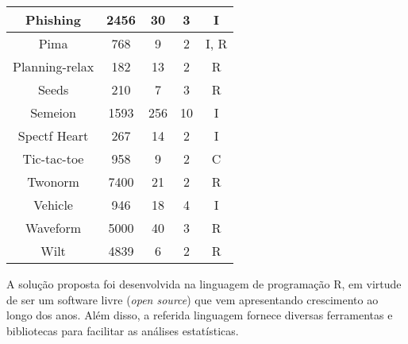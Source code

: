 \begin{table}[h]
\begin{tabular}{|c|c|c|c|c|}
            Phishing                     & 2456  &  30 &  3 & I \\ \hline
            Pima                         &  768  &   9 &  2 & I, R \\ \hline
            Planning-relax               &  182  &  13 &  2 & R \\ \hline
            Seeds                        &  210  &   7 &  3 & R \\ \hline
            Semeion                      & 1593  & 256 & 10 & I \\ \hline
            Spectf Heart                 &  267  &  14 &  2 & I \\ \hline
            Tic-tac-toe                  &  958  &   9 &  2 & C \\ \hline
            Twonorm                      & 7400  &  21 &  2 & R \\ \hline
            Vehicle                      &  946  &  18 &  4 & I \\ \hline
            Waveform                     & 5000  &  40 &  3 & R \\ \hline
            Wilt                         & 4839  &   6 &  2 & R \\ \hline
        \end{tabular}
        \label{tab:bases-de-dados}
    \end{table}

    A solução proposta foi desenvolvida na linguagem de programação R, em virtude de ser um software livre (\textit{open source}) que vem apresentando crescimento ao longo dos anos. Além disso, a referida linguagem fornece diversas ferramentas e bibliotecas para facilitar as análises estatísticas.